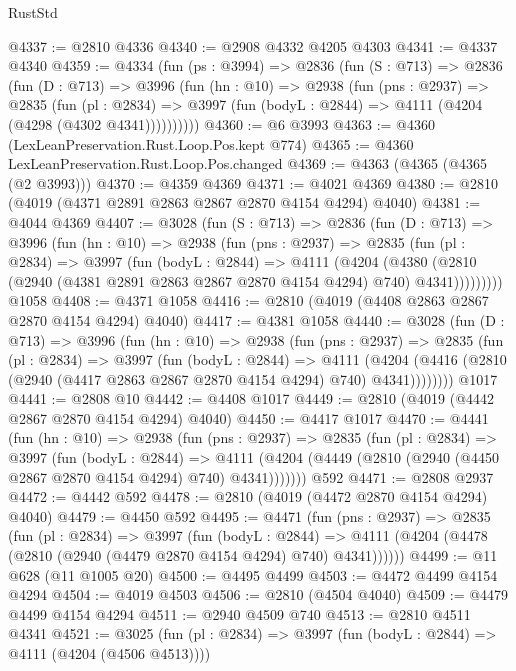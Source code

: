 \begin{lexlean}{RustStd}
\begin{coremodule}
@4337 := @2810 @4336
@4340 := @2908 @4332 @4205 @4303
@4341 := @4337 @4340
@4359 := @4334
    (fun (ps : @3994) =>
    @2836
      (fun (S : @713) =>
      @2836
        (fun (D : @713) =>
        @3996
          (fun (hn : @10) =>
          @2938
            (fun (pns : @2937) =>
            @2835
              (fun (pl : @2834) =>
              @3997 (fun (bodyL : @2844) => @4111 (@4204 (@4298 (@4302 @4341))))))))))
@4360 := @6 @3993
@4363 := @4360 (LexLeanPreservation.Rust.Loop.Pos.kept @774)
@4365 := @4360 LexLeanPreservation.Rust.Loop.Pos.changed
@4369 := @4363 (@4365 (@4365 (@2 @3993)))
@4370 := @4359 @4369
@4371 := @4021 @4369
@4380 := @2810 (@4019 (@4371 @2891 @2863 @2867 @2870 @4154 @4294) @4040)
@4381 := @4044 @4369
@4407 := @3028
    (fun (S : @713) =>
    @2836
      (fun (D : @713) =>
      @3996
        (fun (hn : @10) =>
        @2938
          (fun (pns : @2937) =>
          @2835
            (fun (pl : @2834) =>
            @3997
              (fun (bodyL : @2844) =>
              @4111
                (@4204
                  (@4380
                    (@2810 (@2940 (@4381 @2891 @2863 @2867 @2870 @4154 @4294) @740) @4341)))))))))
    @1058
@4408 := @4371 @1058
@4416 := @2810 (@4019 (@4408 @2863 @2867 @2870 @4154 @4294) @4040)
@4417 := @4381 @1058
@4440 := @3028
    (fun (D : @713) =>
    @3996
      (fun (hn : @10) =>
      @2938
        (fun (pns : @2937) =>
        @2835
          (fun (pl : @2834) =>
          @3997
            (fun (bodyL : @2844) =>
            @4111
              (@4204 (@4416 (@2810 (@2940 (@4417 @2863 @2867 @2870 @4154 @4294) @740) @4341))))))))
    @1017
@4441 := @2808 @10
@4442 := @4408 @1017
@4449 := @2810 (@4019 (@4442 @2867 @2870 @4154 @4294) @4040)
@4450 := @4417 @1017
@4470 := @4441
    (fun (hn : @10) =>
    @2938
      (fun (pns : @2937) =>
      @2835
        (fun (pl : @2834) =>
        @3997
          (fun (bodyL : @2844) =>
          @4111 (@4204 (@4449 (@2810 (@2940 (@4450 @2867 @2870 @4154 @4294) @740) @4341)))))))
    @592
@4471 := @2808 @2937
@4472 := @4442 @592
@4478 := @2810 (@4019 (@4472 @2870 @4154 @4294) @4040)
@4479 := @4450 @592
@4495 := @4471
    (fun (pns : @2937) =>
    @2835
      (fun (pl : @2834) =>
      @3997
        (fun (bodyL : @2844) =>
        @4111 (@4204 (@4478 (@2810 (@2940 (@4479 @2870 @4154 @4294) @740) @4341))))))
@4499 := @11 @628 (@11 @1005 @20)
@4500 := @4495 @4499
@4503 := @4472 @4499 @4154 @4294
@4504 := @4019 @4503
@4506 := @2810 (@4504 @4040)
@4509 := @4479 @4499 @4154 @4294
@4511 := @2940 @4509 @740
@4513 := @2810 @4511 @4341
@4521 := @3025
    (fun (pl : @2834) => @3997 (fun (bodyL : @2844) => @4111 (@4204 (@4506 @4513))))

\end{coremodule}
\end{lexlean}
